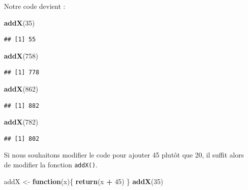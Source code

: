 \documentclass[]{book}
\newenvironment{Shaded}{\begin{snugshade}}{\end{snugshade}}
\newcommand{\ControlFlowTok}[1]{\textcolor[rgb]{0.13,0.29,0.53}{\textbf{#1}}}
\newcommand{\DecValTok}[1]{\textcolor[rgb]{0.00,0.00,0.81}{#1}}
\newcommand{\KeywordTok}[1]{\textcolor[rgb]{0.13,0.29,0.53}{\textbf{#1}}}
\newcommand{\NormalTok}[1]{#1}
\newcommand{\OperatorTok}[1]{\textcolor[rgb]{0.81,0.36,0.00}{\textbf{#1}}}
\newcommand{\StringTok}[1]{\textcolor[rgb]{0.31,0.60,0.02}{#1}}
\begin{document}
Notre code devient :

\begin{Shaded}
\begin{Highlighting}[]
\KeywordTok{addX}\NormalTok{(}\DecValTok{35}\NormalTok{)}
\end{Highlighting}
\end{Shaded}

\begin{verbatim}
## [1] 55
\end{verbatim}

\begin{Shaded}
\begin{Highlighting}[]
\KeywordTok{addX}\NormalTok{(}\DecValTok{758}\NormalTok{)}
\end{Highlighting}
\end{Shaded}

\begin{verbatim}
## [1] 778
\end{verbatim}

\begin{Shaded}
\begin{Highlighting}[]
\KeywordTok{addX}\NormalTok{(}\DecValTok{862}\NormalTok{)}
\end{Highlighting}
\end{Shaded}

\begin{verbatim}
## [1] 882
\end{verbatim}

\begin{Shaded}
\begin{Highlighting}[]
\KeywordTok{addX}\NormalTok{(}\DecValTok{782}\NormalTok{)}
\end{Highlighting}
\end{Shaded}

\begin{verbatim}
## [1] 802
\end{verbatim}

Si nous souhaitons modifier le code pour ajouter 45 plutôt que 20, il suffit alors de modifier la fonction \texttt{addX()}.

\begin{Shaded}
\begin{Highlighting}[]
\NormalTok{addX <-}\StringTok{ }\ControlFlowTok{function}\NormalTok{(x)\{}
  \KeywordTok{return}\NormalTok{(x }\OperatorTok{+}\StringTok{ }\DecValTok{45}\NormalTok{)}
\NormalTok{\}}
\KeywordTok{addX}\NormalTok{(}\DecValTok{35}\NormalTok{)}
\end{Highlighting}
\end{Shaded}
\end{document}
